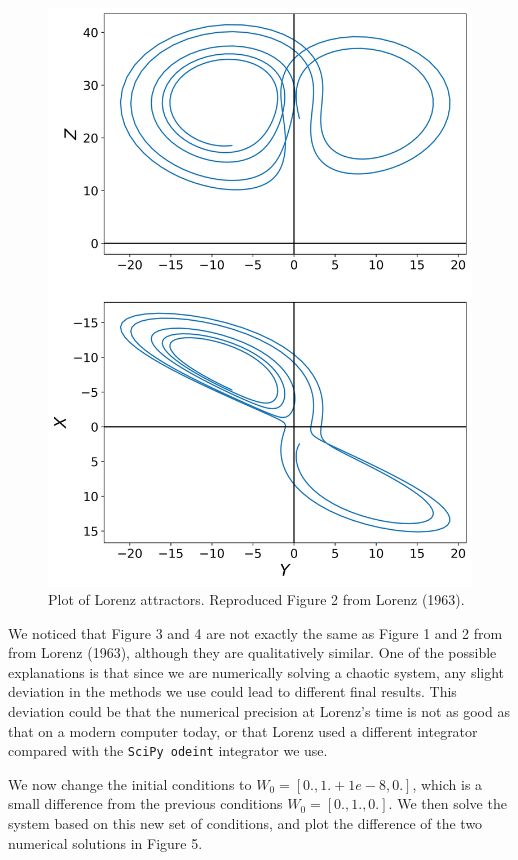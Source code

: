 \documentclass[12pt]{article}
\begin{document}
\begin{figure}[H]
    \centering
    \includegraphics[scale = 0.7]{Figure_4.png}
    \caption{Plot of Lorenz attractors. Reproduced Figure 2 from Lorenz (1963).}
\end{figure}

We noticed that Figure 3 and 4 are not exactly the same as Figure 1 and 2 from from Lorenz (1963), although they are qualitatively similar. One of the possible explanations is that since we are numerically solving a chaotic system, any slight deviation in the methods we use could lead to different final results. This deviation could be that the numerical precision at Lorenz's time is not as good as that on a modern computer today, or that Lorenz used a different integrator compared with the \texttt{SciPy odeint} integrator we use.

We now change the initial conditions to $W_{0}=[0 ., 1. + 1e-8, 0 .]$, which is a small difference from the previous conditions $W_{0}=[0 ., 1., 0 .]$. We then solve the system based on this new set of conditions, and plot the difference of the two numerical solutions in Figure 5.
\end{document}
